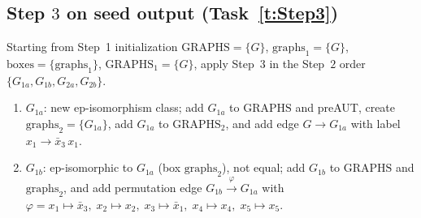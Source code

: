 \subsection*{Step $3$ on seed output (Task~\ref{t:Step3})}
\noindent Starting from Step~1 initialization $\mathrm{GRAPHS}=\{G\}$, $\mathrm{graphs}_{1}=\{G\}$, $\mathrm{boxes}=\{\mathrm{graphs}_{1}\}$, $\mathrm{GRAPHS}_{1}=\{G\}$, apply Step~$3$ in the Step~$2$ order $\{G_{1a},G_{1b},G_{2a},G_{2b}\}$.

\begin{enumerate}[label=\textbf{\arabic*.}, leftmargin=*]
\item $G_{1a}$: new ep-isomorphism class; add $G_{1a}$ to $\mathrm{GRAPHS}$ and preAUT, create $\mathrm{graphs}_{2}=\{G_{1a}\}$, add $G_{1a}$ to $\mathrm{GRAPHS}_{2}$, and add edge $G \to G_{1a}$ with label $x_{1} \to \bar{x}_{3}\,x_{1}$.
\item $G_{1b}$: ep-isomorphic to $G_{1a}$ (box $\mathrm{graphs}_{2}$), not equal; add $G_{1b}$ to $\mathrm{GRAPHS}$ and $\mathrm{graphs}_{2}$, and add permutation edge $G_{1b} \xrightarrow{\varphi} G_{1a}$ with $\varphi=x_{1} \mapsto \bar{x}_{3},\; x_{2} \mapsto x_{2},\; x_{3} \mapsto \bar{x}_{1},\; x_{4} \mapsto x_{4},\; x_{5} \mapsto x_{5}$.
\end{enumerate}
